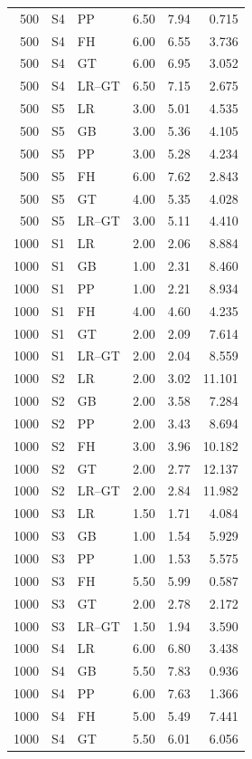 \documentclass[12pt]{article}
\theoremstyle{definition}
\theoremstyle{remark}
\begin{document}
\begin{longtable}{rclrrr}
500 & S4 & PP & 6.50 & 7.94 & 0.715 \\
500 & S4 & FH & 6.00 & 6.55 & 3.736 \\
500 & S4 & GT & 6.00 & 6.95 & 3.052 \\
500 & S4 & LR--GT & 6.50 & 7.15 & 2.675 \\
500 & S5 & LR & 3.00 & 5.01 & 4.535 \\
500 & S5 & GB & 3.00 & 5.36 & 4.105 \\
500 & S5 & PP & 3.00 & 5.28 & 4.234 \\
500 & S5 & FH & 6.00 & 7.62 & 2.843 \\
500 & S5 & GT & 4.00 & 5.35 & 4.028 \\
500 & S5 & LR--GT & 3.00 & 5.11 & 4.410 \\
1000 & S1 & LR & 2.00 & 2.06 & 8.884 \\
1000 & S1 & GB & 1.00 & 2.31 & 8.460 \\
1000 & S1 & PP & 1.00 & 2.21 & 8.934 \\
1000 & S1 & FH & 4.00 & 4.60 & 4.235 \\
1000 & S1 & GT & 2.00 & 2.09 & 7.614 \\
1000 & S1 & LR--GT & 2.00 & 2.04 & 8.559 \\
1000 & S2 & LR & 2.00 & 3.02 & 11.101 \\
1000 & S2 & GB & 2.00 & 3.58 & 7.284 \\
1000 & S2 & PP & 2.00 & 3.43 & 8.694 \\
1000 & S2 & FH & 3.00 & 3.96 & 10.182 \\
1000 & S2 & GT & 2.00 & 2.77 & 12.137 \\
1000 & S2 & LR--GT & 2.00 & 2.84 & 11.982 \\
1000 & S3 & LR & 1.50 & 1.71 & 4.084 \\
1000 & S3 & GB & 1.00 & 1.54 & 5.929 \\
1000 & S3 & PP & 1.00 & 1.53 & 5.575 \\
1000 & S3 & FH & 5.50 & 5.99 & 0.587 \\
1000 & S3 & GT & 2.00 & 2.78 & 2.172 \\
1000 & S3 & LR--GT & 1.50 & 1.94 & 3.590 \\
1000 & S4 & LR & 6.00 & 6.80 & 3.438 \\
1000 & S4 & GB & 5.50 & 7.83 & 0.936 \\
1000 & S4 & PP & 6.00 & 7.63 & 1.366 \\
1000 & S4 & FH & 5.00 & 5.49 & 7.441 \\
1000 & S4 & GT & 5.50 & 6.01 & 6.056 \\

\end{longtable}
\end{document}
